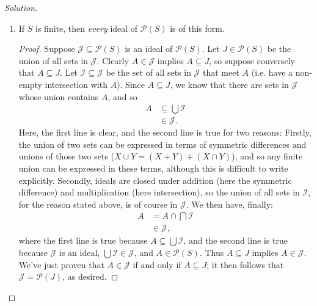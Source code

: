 \documentclass[12pt]{article}
\newenvironment{solution}
  {\renewcommand\qedsymbol{$\blacksquare$}\begin{proof}[Solution]}
{\end{proof}}
\newenvironment{sproof}{
  \renewcommand\qedsymbol{$\square$}
  \begin{proof}
  }{
  \end{proof}
}
\theoremstyle{remark}
\begin{document}
\begin{solution}
\begin{enumerate}
    \item If $S$ is finite, then \textit{every} ideal of $\mathscr{P}(S)$ is of this form.
      \begin{sproof}
        \indent Suppose $\mathcal{J}\subseteq\mathscr{P}(S)$ 
        is an ideal of $\mathscr{P}(S)$.
        Let $J\in\mathscr{P}(S)$ be the union of all sets in $\mathcal{J}$.
        Clearly $A\in \mathcal{J}$ implies $A\subseteq J$, so suppose conversely that $A\subseteq J$.
        Let $\mathcal{I}\subseteq\mathcal{J}$ be the set of all sets in $\mathcal{J}$ that meet $A$
        (i.e. have a non-empty intersection with $A$).
        Since $A\subseteq J$, we know that there are sets in $\mathcal{J}$ whose union contains $A$, and so
        \begin{align*}
          A &\subseteq \bigcup\mathcal{I} \\
          &\in \mathcal{J}.
        \end{align*}
        \indent Here, the first line is clear, and the second line is true for two reasons: 
        Firstly, the union of two sets can be expressed in terms of symmetric 
        differences and unions of those two sets ($X\cup Y=(X+Y)+(X\cap Y)$), 
        and so any finite union can be expressed in these terms, although this is
        difficult to write explicitly.
        Secondly, ideals are closed under addition (here the symmetric difference) and multiplication 
        (here intersection), so the union of all sets in $\mathcal{I}$, for the reason stated above,
        is of course in $\mathcal{J}$.
        We then have, finally:
        \begin{align*}
          A &= A\cap\bigcap\mathcal{I}\\
          &\in\mathcal{J},
        \end{align*}
        where the first line is true because $A\subseteq\bigcup\mathcal{I}$, and the second line
        is true because $\mathcal{J}$ is an ideal, $\bigcup\mathcal{I}\in\mathcal{J}$, and 
        $A\in\mathscr{P}(S)$.
        Thus $A\subseteq J$ implies $A\in\mathcal{J}$.\\
        \indent We've just proven that $A\in\mathcal{J}$ if and only if $A\subseteq J$; it then follows
        that $\mathcal{J} = \mathscr{P}(J)$, as desired.
      \end{sproof}


\end{enumerate}
\end{solution}
\end{document}
